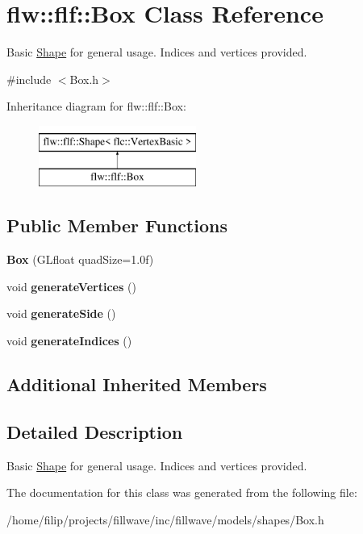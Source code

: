 \hypertarget{classflw_1_1flf_1_1Box}{}\section{flw\+:\+:flf\+:\+:Box Class Reference}
\label{classflw_1_1flf_1_1Box}


Basic \hyperlink{classflw_1_1flf_1_1Shape}{Shape} for general usage. Indices and vertices provided.  




{\ttfamily \#include $<$Box.\+h$>$}

Inheritance diagram for flw\+:\+:flf\+:\+:Box\+:\begin{figure}[H]
\begin{center}
\leavevmode
\includegraphics[height=2.000000cm]{classflw_1_1flf_1_1Box}
\end{center}
\end{figure}
\subsection*{Public Member Functions}
\begin{DoxyCompactItemize}
\item 
\mbox{\label{classflw_1_1flf_1_1Box_a1810262c6b67eb89f6780b6c1513fd13}} 
{\bfseries Box} (G\+Lfloat quad\+Size=1.\+0f)
\item 
\mbox{\label{classflw_1_1flf_1_1Box_a3c136b1b3d75e5a79c86136074c93cf7}} 
void {\bfseries generate\+Vertices} ()
\item 
\mbox{\label{classflw_1_1flf_1_1Box_a3c137640c604691d4398293e0a8b7382}} 
void {\bfseries generate\+Side} ()
\item 
\mbox{\label{classflw_1_1flf_1_1Box_a0b8cc4c091b5e086cb510a25bd462a62}} 
void {\bfseries generate\+Indices} ()
\end{DoxyCompactItemize}
\subsection*{Additional Inherited Members}


\subsection{Detailed Description}
Basic \hyperlink{classflw_1_1flf_1_1Shape}{Shape} for general usage. Indices and vertices provided. 

The documentation for this class was generated from the following file\+:\begin{DoxyCompactItemize}
\item 
/home/filip/projects/fillwave/inc/fillwave/models/shapes/Box.\+h\end{DoxyCompactItemize}
